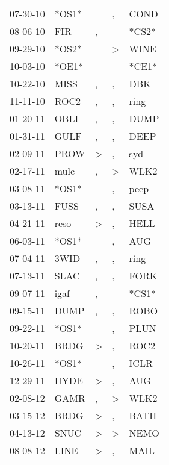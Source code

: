 \begin{supertabular}{lllll}
 07-30-10 &  *OS1* &               &             , &   COND \\
 08-06-10 &    FIR &             , &               &  *CS2* \\
 09-29-10 &  *OS2* &               &  \textgreater &   WINE \\
 10-03-10 &  *OE1* &               &               &  *CE1* \\
 10-22-10 &   MISS &             , &             , &    DBK \\
 11-11-10 &   ROC2 &             , &             , &   ring \\
 01-20-11 &   OBLI &             , &             , &   DUMP \\
 01-31-11 &   GULF &             , &             , &   DEEP \\
 02-09-11 &   PROW &  \textgreater &             , &    syd \\
 02-17-11 &   mulc &             , &  \textgreater &   WLK2 \\
 03-08-11 &  *OS1* &               &             , &   peep \\
 03-13-11 &   FUSS &             , &             , &   SUSA \\
 04-21-11 &   reso &  \textgreater &             , &   HELL \\
 06-03-11 &  *OS1* &               &             , &    AUG \\
 07-04-11 &   3WID &             , &             , &   ring \\
 07-13-11 &   SLAC &             , &             , &   FORK \\
 09-07-11 &   igaf &             , &               &  *CS1* \\
 09-15-11 &   DUMP &             , &             , &   ROBO \\
 09-22-11 &  *OS1* &               &             , &   PLUN \\
 10-20-11 &   BRDG &  \textgreater &             , &   ROC2 \\
 10-26-11 &  *OS1* &               &             , &   ICLR \\
 12-29-11 &   HYDE &  \textgreater &             , &    AUG \\
 02-08-12 &   GAMR &             , &  \textgreater &   WLK2 \\
 03-15-12 &   BRDG &  \textgreater &             , &   BATH \\
 04-13-12 &   SNUC &  \textgreater &  \textgreater &   NEMO \\
 08-08-12 &   LINE &  \textgreater &             , &   MAIL \\

\end{supertabular}

